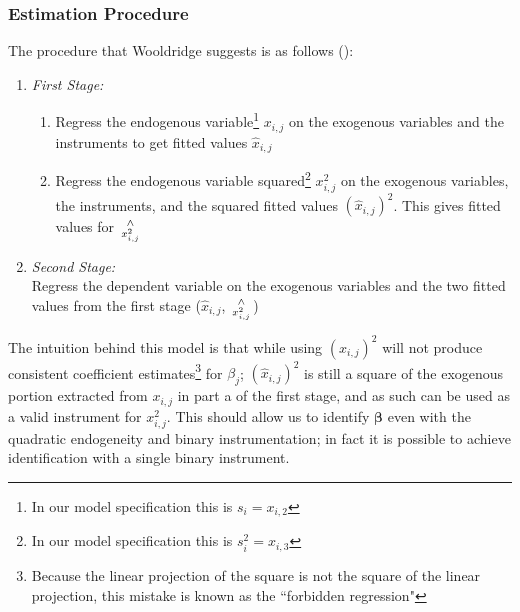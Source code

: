 \documentclass[12pt]{article}
\begin{document}
\subsubsection{Estimation Procedure} \label{procedure}
The procedure that Wooldridge suggests is as follows (\cite{wooldridge}):
\begin{spacing}{1}
\begin{enumerate}[label={(\arabic*)}]
	\item \textit{First Stage:}
	\begin{enumerate}
		\item Regress the endogenous variable\footnote{In our model specification this is $s_i = x_{i,2}$} $x_{i,j}$ on the exogenous variables and the instruments to get fitted values $\hat{x}_{i,j}$
		\item Regress the endogenous variable squared\footnote{In our model specification this is $s_i^2 = x_{i,3}$} $x_{i,j}^2$ on the exogenous variables, the instruments, and the squared fitted values $(\hat{x}_{i,j})^2$. This gives fitted values for ${\wedge \atop x_{i,j}^2}$ 
	\end{enumerate} 
	\item \textit{Second Stage:} \\
	Regress the dependent variable on the exogenous variables and the two fitted values from the first stage ($\hat{x}_{i,j}$, ${\wedge \atop x_{i,j}^2}$)
\end{enumerate}
\end{spacing}
\noindent The intuition behind this model is that while using $(\hat{x}_{i,j})^2$ will not produce consistent coefficient estimates\footnote{Because the linear projection of the square is not the square of the linear projection, this mistake is known as the ``forbidden regression"} for $\beta_j$; $(\hat{x}_{i,j})^2$ is still a square of the exogenous portion extracted from $x_{i,j}$ in part a of the first stage, and as such can be used as a valid instrument for $x_{i,j}^2$. This should allow us to identify $\bm{\beta}$ even with the quadratic endogeneity and binary instrumentation; in fact it is possible to achieve identification with a single binary instrument.

\end{document}

